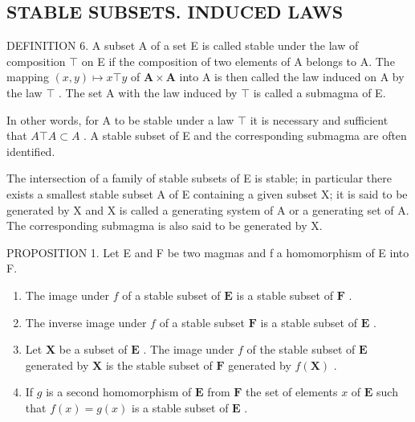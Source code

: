 \subsection{STABLE SUBSETS. INDUCED LAWS}

DEFINITION 6. A subset A of a set E is called stable under the law of composition \(\top\) on E if the composition of two elements of A belongs to A. The mapping \((x,y)\mapsto x\top y\) of \(\mathbf{A}\times \mathbf{A}\) into A is then called the law induced on A by the law \(\top\) . The set A with the law induced by \(\top\) is called a submagma of E.

In other words, for A to be stable under a law \(\top\) it is necessary and sufficient that \(A \top A \subset A\) . A stable subset of E and the corresponding submagma are often identified.

The intersection of a family of stable subsets of E is stable; in particular there exists a smallest stable subset A of E containing a given subset X; it is said to be generated by X and X is called a generating system of A or a generating set of A. The corresponding submagma is also said to be generated by X.

PROPOSITION 1. Let E and F be two magmas and f a homomorphism of E into F.

\begin{enumerate}
\def\labelenumi{(\roman{enumi})}
\item
  The image under \(f\) of a stable subset of \(\mathbf{E}\) is a stable subset of \(\mathbf{F}\) .
\item
  The inverse image under \(f\) of a stable subset \(\mathbf{F}\) is a stable subset of \(\mathbf{E}\) .
\item
  Let \(\mathbf{X}\) be a subset of \(\mathbf{E}\) . The image under \(f\) of the stable subset of \(\mathbf{E}\) generated by \(\mathbf{X}\) is the stable subset of \(\mathbf{F}\) generated by \(f(\mathbf{X})\) .
\item
  If \(g\) is a second homomorphism of \(\mathbf{E}\) from \(\mathbf{F}\) the set of elements \(x\) of \(\mathbf{E}\) such that \(f(x) = g(x)\) is a stable subset of \(\mathbf{E}\) .
\end{enumerate}

